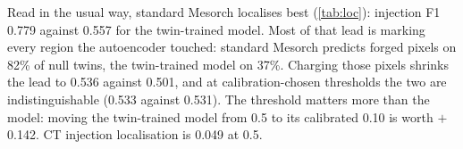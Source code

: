 Read in the usual way, standard Mesorch localises best (\cref{tab:loc}): injection F1 0.779 against 0.557 for the twin-trained model. %
Most of that lead is marking every region the autoencoder touched: standard Mesorch predicts forged pixels on 82\% of null twins, the twin-trained model on 37\%. %
Charging those pixels shrinks the lead to 0.536 against 0.501, %
and at calibration-chosen thresholds the two are indistinguishable (0.533 against 0.531). %
The threshold matters more than the model: moving the twin-trained model from 0.5 to its calibrated 0.10 is worth $+$0.142. %
CT injection localisation is 0.049 at 0.5. %
